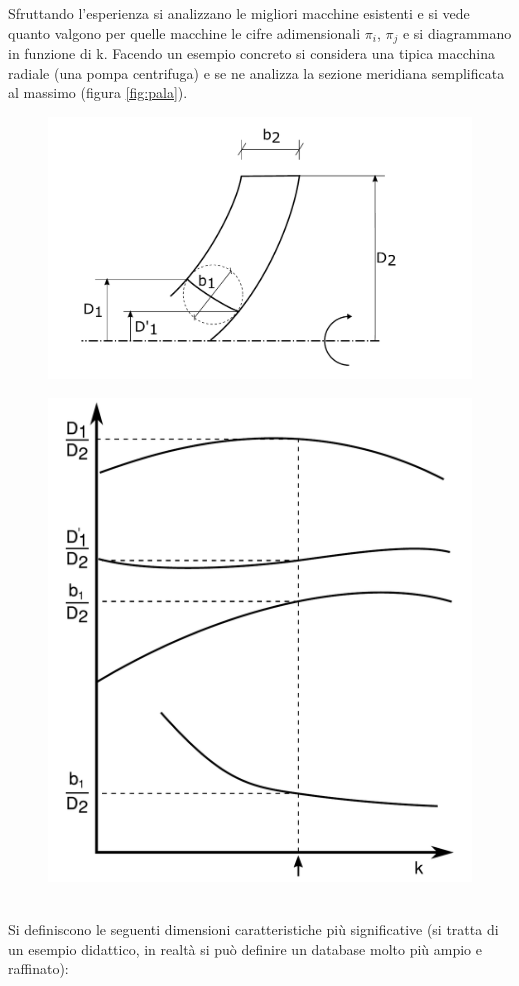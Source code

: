 Sfruttando l'esperienza si analizzano le migliori macchine esistenti e si vede quanto valgono per quelle macchine le cifre adimensionali $\pi_i$, $\pi_j$ e si diagrammano in funzione di k. Facendo un esempio concreto si considera una tipica macchina radiale (una pompa centrifuga) e se ne analizza la sezione meridiana semplificata al massimo (figura \ref{fig:pala}).
\begin{figure}
\centering
\begin{minipage}{.5\textwidth}
  \centering
  \includegraphics[width=.9\linewidth]{fig/pala.pdf}
  \label{fig:pala}
\end{minipage}%
\begin{minipage}{.5\textwidth}
  \centering
  \includegraphics[width=.6\linewidth]{fig/primo_1.pdf}
  \label{fig:primo_1}
\end{minipage}
\end{figure}
\\Si definiscono le seguenti dimensioni caratteristiche più significative (si tratta di un esempio didattico, in realtà si può definire un database molto più ampio e raffinato):
